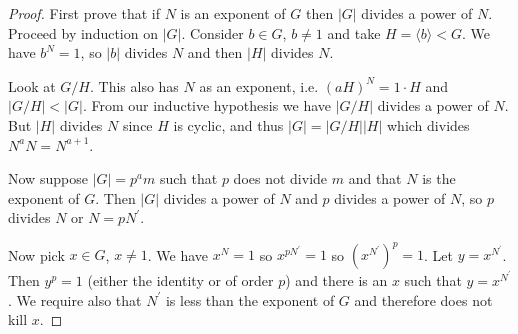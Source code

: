\documentclass{article}
\begin{document}
\begin{proof}
First prove that if $N$ is an exponent of $G$ then $|G|$ divides a
power of $N$. Proceed by induction on $|G|$. Consider $b \in G$, $b
\neq 1$ and take $H = \langle b \rangle < G$. We have $b^N = 1$, so
$|b|$ divides $N$ and then $|H|$ divides $N$.

Look at $G / H$. This also has $N$ as an exponent, i.e.
$(aH)^N = 1 \cdot H$ and $|G / H| < |G|$. From our inductive
hypothesis we have $|G / H|$ divides a power of $N$. But
$|H|$ divides $N$ since $H$ is cyclic, and thus 
$|G| = |G / H| |H|$ which divides $N^a N = N^{a+1}$.

Now suppose $|G| = p^a m$ such that $p$ does not divide $m$
and that $N$ is the exponent of $G$. Then $|G|$ divides a power of $N$
and $p$ divides a power of $N$, so $p$ divides $N$ or $N = p
N^\prime$.

Now pick $x \in G$, $x \neq 1$. We have $x^N = 1$ so $x^{pN^\prime} =
1$ so $(x^{N^\prime})^p = 1$. Let $y = x^{N^\prime}$. Then $y^p = 1$
(either the identity or of order $p$) and there is an $x$ such that
$y = x^{N^\prime}$. We require also that $N^\prime$ is less than the
exponent of $G$ and therefore does not kill $x$.
\end{proof}
\end{document}
